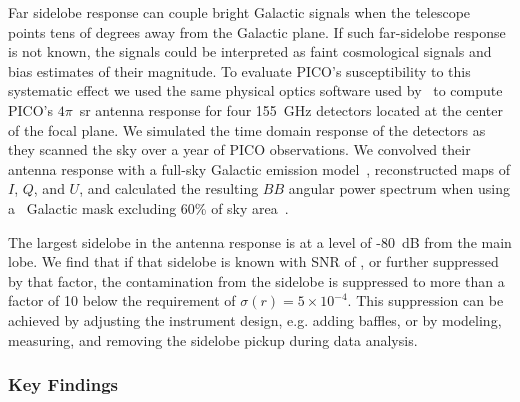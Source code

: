\documentclass[PICOReport.tex]{subfiles}
\begin{document}
Far sidelobe response can couple bright Galactic signals when the telescope points tens of degrees away from the Galactic plane. If such far-sidelobe response is not known, the signals could be interpreted as faint cosmological signals and bias estimates of their magnitude. To evaluate PICO's susceptibility to this systematic effect we used the same physical optics software used by \planck\ to compute PICO's $4\pi$~sr antenna response for four 155~GHz detectors located at the center of the focal plane. We simulated the time domain response of the detectors as they scanned the sky over a year of PICO observations. We convolved their antenna response with a full-sky Galactic emission model~\citep{pysm}, reconstructed maps of $I$, $Q$, and $U$, and calculated the resulting $BB$ angular power spectrum when using a \planck\ Galactic mask excluding 60\% of sky area~\citep{??}. 

The largest sidelobe in the antenna response is at a level of -80~dB from the main lobe. We find that if that sidelobe is known with \ac{SNR} of , or further suppressed by that factor, the contamination from the sidelobe is suppressed to more than a factor of 10 below the requirement of $\sigma(r) = 5 \times 10^{-4}$. This suppression can be achieved by adjusting the instrument design, e.g. adding baffles, or by modeling, measuring, and removing the sidelobe pickup during data analysis. 


 


\subsubsection{Key Findings}
\label{sec:systematics_key}
\end{document}
